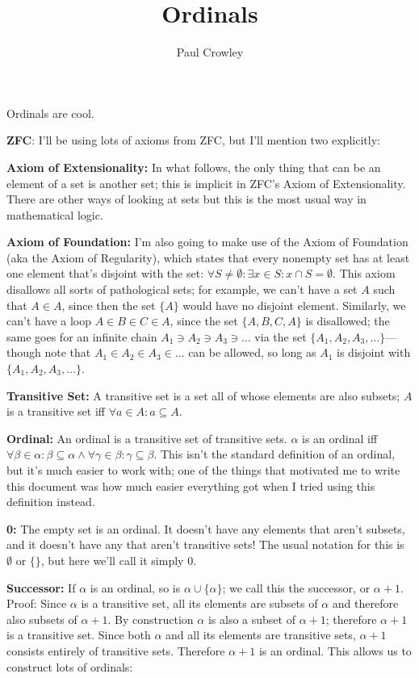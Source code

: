 \documentclass{article}
\title{Ordinals}
\author{Paul Crowley}
\begin{document}
\maketitle
Ordinals are cool.

\textbf{ZFC}: I'll be using lots of axioms from ZFC, but I'll mention two explicitly:

\textbf{Axiom of Extensionality:} In what follows, the only thing that can be an element of a set is another set; this is implicit in ZFC's Axiom of Extensionality. There are other ways of looking at sets but this is the most usual way in mathematical logic.

\textbf{Axiom of Foundation:} I'm also going to make use of the Axiom of Foundation (aka the Axiom of Regularity), which states that every nonempty set has at least one element that's disjoint with the set: $\forall S \neq \emptyset:  \exists x \in S: x \cap S = \emptyset$. This axiom disallows all sorts of pathological sets; for example, we can't have a set $A$ such that $A \in A$, since then the set $\{A\}$ would have no disjoint element. Similarly, we can't have a loop $A \in B \in C \in A$, since the set $\{A, B, C, A\}$ is disallowed; the same goes for an infinite chain $A_1 \ni A_2 \ni A_3 \ni \ldots$ via the set $\{A_1, A_2, A_3, \ldots\}$---though note that $A_1 \in A_2 \in A_3 \in \ldots$ can be allowed, so long as $A_1$ is disjoint with $\{A_1, A_2, A_3, \ldots\}$.

\textbf{Transitive Set:} A transitive set is a set all of whose elements are also subsets; $A$ is a transitive set iff $\forall a \in A: a \subseteq A$.

\textbf{Ordinal:} An ordinal is a transitive set of transitive sets. $\alpha$ is an ordinal iff $\forall \beta \in \alpha: \beta \subseteq \alpha \wedge \forall \gamma \in \beta: \gamma \subseteq \beta$. This isn't the standard definition of an ordinal, but it's much easier to work with; one of the things that motivated me to write this document was how much easier everything got when I tried using this definition instead.

\textbf{0:} The empty set is an ordinal. It doesn't have any elements that aren't subsets, and it doesn't have any that aren't transitive sets! The usual notation for this is $\emptyset$ or $\{\}$, but here we'll call it simply 0.

\textbf{Successor:} If $\alpha$ is an ordinal, so is $\alpha \cup \{\alpha\}$; we call this the successor, or $\alpha + 1$. Proof: Since $\alpha$ is a transitive set, all its elements are subsets of $\alpha$ and therefore also subsets of $\alpha + 1$. By construction $\alpha$ is also a subset of $\alpha + 1$; therefore $\alpha + 1$ is a transitive set. Since both $\alpha$ and all its elements are transitive sets, $\alpha + 1$ consists entirely of transitive sets. Therefore $\alpha + 1$ is an ordinal. This allows us to construct lots of ordinals:
\end{document}
